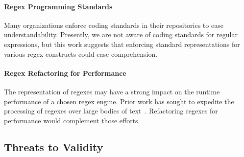 %

\vspace{-1pt}
\paragraph{Regex Programming Standards}
Many organizations enforce coding standards in their repositories to ease understandability.
Presently, we are not aware of coding standards for regular expressions, but this work suggests that enforcing standard representations for various regex constructs could ease comprehension.

\vspace{-1pt}
\paragraph{Regex Refactoring for Performance}
The representation of regexes may have a strong impact on the runtime performance of a chosen regex engine. Prior work has sought to expedite the processing of regexes over large bodies of text~\cite{Baeza-Yates:1996:FTS:235809.235810}.
Refactoring regexes for performance would complement those efforts.

\subsection{Threats to Validity}

